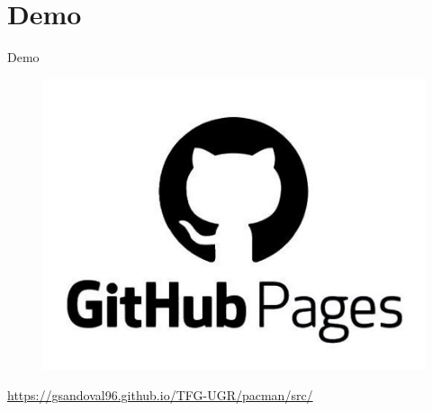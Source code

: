 \documentclass{beamer}
\begin{document}
\section{Demo}

    \begin{frame}{Demo}
    \centering
    
        \begin{figure}[H]
            \begin{center}
                \includegraphics[scale=0.15]{img/githubPages.png}
            \end{center}
        \end{figure}   
    
        \href{https://gsandoval96.github.io/TFG-UGR/pacman/src/}{https://gsandoval96.github.io/TFG-UGR/pacman/src/}
        
    \end{frame}
\end{document}
